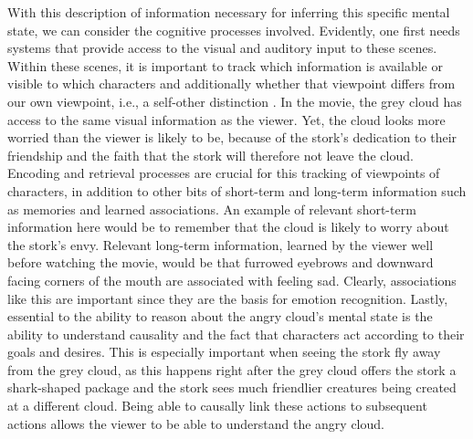 With this description of information necessary for inferring this specific mental state, we can consider the cognitive processes involved. Evidently, one first needs systems that provide access to the visual and auditory input to these scenes. Within these scenes, it is important to track which information is available or visible to which characters and additionally whether that viewpoint differs from our own viewpoint, i.e., a self-other distinction \citep{quesque2020}. In the movie, the grey cloud has access to the same visual information as the viewer. Yet, the cloud looks more worried than the viewer is likely to be, because of the stork's dedication to their friendship and the faith that the stork will therefore not leave the cloud. Encoding and retrieval processes are crucial for this tracking of viewpoints of characters, in addition to other bits of short-term and long-term information such as memories and learned associations. An example of relevant short-term information here would be to remember that the cloud is likely to worry about the stork's envy. Relevant long-term information, learned by the viewer well before watching the movie, would be that furrowed eyebrows and downward facing corners of the mouth are associated with feeling sad. Clearly, associations like this are important since they are the basis for emotion recognition. Lastly, essential to the ability to reason about the angry cloud's mental state is the ability to understand causality and the fact that characters act according to their goals and desires. This is especially important when seeing the stork fly away from the grey cloud, as this happens right after the grey cloud offers the stork a shark-shaped package and the stork sees much friendlier creatures being created at a different cloud. Being able to causally link these actions to subsequent actions allows the viewer to be able to understand the angry cloud.

